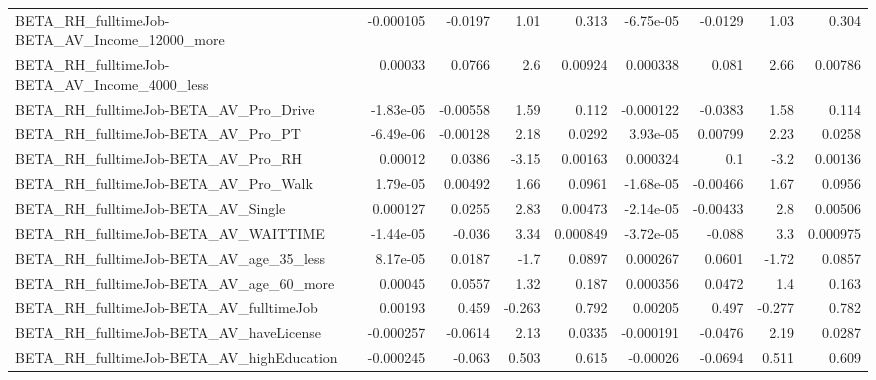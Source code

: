 \begin{tabular}{lrrrrrrrr}
BETA\_RH\_fulltimeJob-BETA\_AV\_Income\_12000\_more      &   -0.000105 &      -0.0197 &      1.01 &    0.313 &  -6.75e-05 &     -0.0129 &         1.03 &         0.304 \\
BETA\_RH\_fulltimeJob-BETA\_AV\_Income\_4000\_less       &     0.00033 &       0.0766 &       2.6 &  0.00924 &   0.000338 &       0.081 &         2.66 &       0.00786 \\
BETA\_RH\_fulltimeJob-BETA\_AV\_Pro\_Drive              &   -1.83e-05 &     -0.00558 &      1.59 &    0.112 &  -0.000122 &     -0.0383 &         1.58 &         0.114 \\
BETA\_RH\_fulltimeJob-BETA\_AV\_Pro\_PT                 &   -6.49e-06 &     -0.00128 &      2.18 &   0.0292 &   3.93e-05 &     0.00799 &         2.23 &        0.0258 \\
BETA\_RH\_fulltimeJob-BETA\_AV\_Pro\_RH                 &     0.00012 &       0.0386 &     -3.15 &  0.00163 &   0.000324 &         0.1 &         -3.2 &       0.00136 \\
BETA\_RH\_fulltimeJob-BETA\_AV\_Pro\_Walk               &    1.79e-05 &      0.00492 &      1.66 &   0.0961 &  -1.68e-05 &    -0.00466 &         1.67 &        0.0956 \\
BETA\_RH\_fulltimeJob-BETA\_AV\_Single                 &    0.000127 &       0.0255 &      2.83 &  0.00473 &  -2.14e-05 &    -0.00433 &          2.8 &       0.00506 \\
BETA\_RH\_fulltimeJob-BETA\_AV\_WAITTIME               &   -1.44e-05 &       -0.036 &      3.34 & 0.000849 &  -3.72e-05 &      -0.088 &          3.3 &      0.000975 \\
BETA\_RH\_fulltimeJob-BETA\_AV\_age\_35\_less            &    8.17e-05 &       0.0187 &      -1.7 &   0.0897 &   0.000267 &      0.0601 &        -1.72 &        0.0857 \\
BETA\_RH\_fulltimeJob-BETA\_AV\_age\_60\_more            &     0.00045 &       0.0557 &      1.32 &    0.187 &   0.000356 &      0.0472 &          1.4 &         0.163 \\
BETA\_RH\_fulltimeJob-BETA\_AV\_fulltimeJob            &     0.00193 &        0.459 &    -0.263 &    0.792 &    0.00205 &       0.497 &       -0.277 &         0.782 \\
BETA\_RH\_fulltimeJob-BETA\_AV\_haveLicense            &   -0.000257 &      -0.0614 &      2.13 &   0.0335 &  -0.000191 &     -0.0476 &         2.19 &        0.0287 \\
BETA\_RH\_fulltimeJob-BETA\_AV\_highEducation          &   -0.000245 &       -0.063 &     0.503 &    0.615 &   -0.00026 &     -0.0694 &        0.511 &         0.609 \\

\end{tabular}
